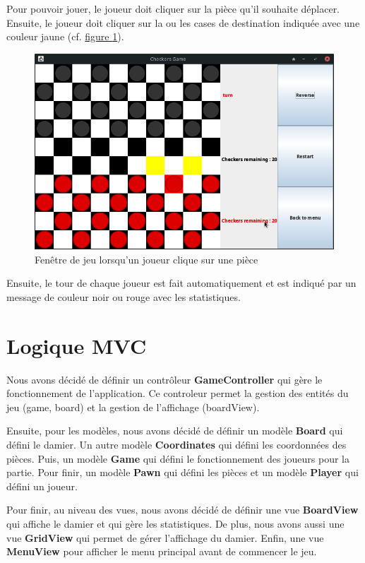Pour pouvoir jouer, le joueur doit cliquer sur la pièce qu'il souhaite déplacer. Ensuite,
le joueur doit cliquer sur la ou les cases de destination indiquée avec une couleur jaune
(cf. \hyperref[f:fenetreClick]{figure \ref{f:fenetreClick}}).

\begin{figure}[H]
    \centering
    \includegraphics[width=1\columnwidth]{figures/boardGameClick.png}
    \caption[Fenêtre de jeu lorsqu'un joueur clique sur une pièce]{Fenêtre de jeu lorsqu'un joueur clique sur une pièce}
    \label{f:fenetreClick}
\end{figure}

Ensuite, le tour de chaque joueur est fait automatiquement et est indiqué par un message de couleur noir ou rouge 
avec les statistiques.

\section{Logique MVC}

Nous avons décidé de définir un contrôleur \textbf{GameController} qui gère le fonctionnement de l'application.
Ce controleur permet la gestion des entités du jeu (game, board)  et la gestion de l'affichage (boardView). \medskip

Ensuite, pour les modèles, nous avons décidé de définir un modèle \textbf{Board} qui défini le damier. 
Un autre modèle \textbf{Coordinates} qui défini les coordonnées des pièces. 
Puis, un modèle \textbf{Game} qui défini le fonctionnement des joueurs pour la partie. 
Pour finir, un modèle \textbf{Pawn} qui défini les pièces et un modèle \textbf{Player} qui 
défini un joueur. \medskip

Pour finir, au niveau des vues, nous avons décidé de définir une vue \textbf{BoardView} qui affiche le damier 
et qui gère les statistiques. De plus, nous avons aussi une vue \textbf{GridView} 
qui permet de gérer l'affichage du damier. Enfin, une vue \textbf{MenuView} pour afficher 
le menu principal avant de commencer le jeu.

